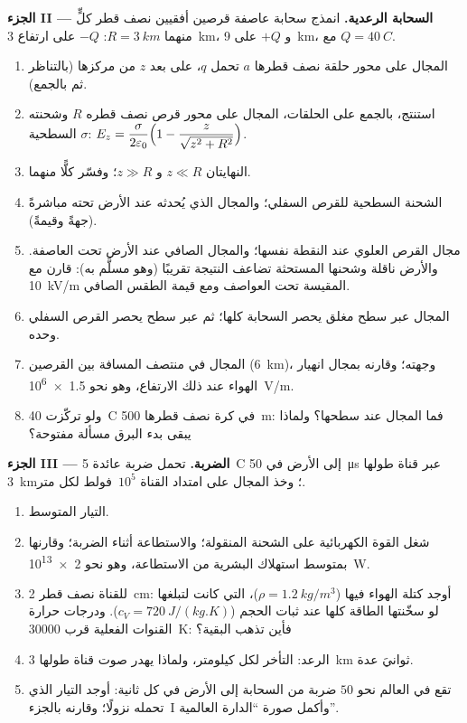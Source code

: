 \begin{problem}
\medskip
\noindent\textbf{الجزء II --- السحابة الرعدية.}
انمذج سحابة عاصفة قرصين أفقيين نصف قطر كلٍّ منهما $R = \qty{3}{km}$:
$-Q$ على ارتفاع \qty{3}{km}، و $+Q$ على \qty{9}{km}، مع $Q = \qty{40}{C}$.
\begin{enumerate}[resume]
  \item المجال على محور حلقة نصف قطرها $a$ تحمل $q$، على
        بعد $z$ من مركزها (بالتناظر ثم بالجمع).
  \item استنتج، بالجمع على الحلقات، المجال على محور قرص
        نصف قطره $R$ وشحنته السطحية $\sigma$:
        $E_z = \dfrac{\sigma}{2\varepsilon_0}\Bigl(1 - \dfrac{z}{\sqrt{z^2 + R^2}}\Bigr)$.
  \item النهايتان $z \ll R$ و $z \gg R$؛ وفسّر كلًّا منهما.
  \item الشحنة السطحية للقرص السفلي؛ والمجال الذي يُحدثه عند الأرض
        تحته مباشرةً (جهةً وقيمةً).
  \item مجال القرص العلوي عند النقطة نفسها؛ والمجال الصافي عند
        الأرض تحت العاصفة. والأرض ناقلة وشحنها المستحثة
        تضاعف النتيجة تقريبًا (وهو مسلَّم به): قارن مع
        \qty{10}{kV/m} المقيسة تحت العواصف ومع قيمة الطقس
        الصافي.
  \item {} المجال عبر سطح مغلق يحصر السحابة كلها؛ ثم عبر
        سطح يحصر القرص السفلي وحده.
  \item المجال في منتصف المسافة بين القرصين (\qty{6}{km})، وجهته؛
        وقارنه بمجال انهيار الهواء عند ذلك
        الارتفاع، وهو نحو \qty{1.5e6}{V/m}.
  \item ولو تركّزت \qty{40}{C} في كرة نصف قطرها
        \qty{500}{m}: فما المجال عند سطحها؟ ولماذا يبقى بدء
        البرق مسألة مفتوحة؟
\end{enumerate}

\medskip
\noindent\textbf{الجزء III --- الضربة.}
تحمل ضربة عائدة \qty{5}{C} إلى الأرض في \qty{50}{\micro s}
عبر قناة طولها \qty{3}{km}؛ وخذ المجال على امتداد القناة
$10^5$~فولط لكل متر.
\begin{enumerate}[resume]
  \item التيار المتوسط.
  \item شغل القوة الكهربائية على الشحنة المنقولة؛ والاستطاعة
        أثناء الضربة؛ وقارنها بمتوسط استهلاك البشرية من
        الاستطاعة، وهو نحو \qty{2e13}{W}.
  \item للقناة نصف قطر \qty{2}{cm}: أوجد كتلة الهواء فيها
        ($\rho = \qty{1.2}{kg/m^3}$)،  التي كانت لتبلغها لو
        سخّنتها الطاقة كلها عند ثبات الحجم ($c_V =
        \qty{720}{J/(kg.K)}$). ودرجات حرارة القنوات الفعلية قرب
        \qty{30000}{K}: فأين تذهب البقية؟
  \item الرعد: التأخر لكل كيلومتر، ولماذا يهدر صوت قناة
        طولها \qty{3}{km} ثوانيَ عدة.
  \item تقع في العالم نحو $50$ ضربة من السحابة إلى الأرض في كل ثانية:
        أوجد التيار الذي تحمله نزولًا؛ وقارنه بالجزء~I وأكمل
        صورة ``الدارة العالمية''.
\end{enumerate}


\end{problem}
